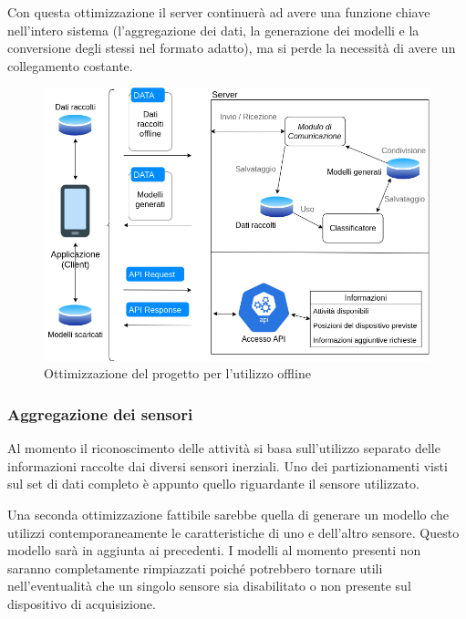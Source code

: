 \vspace{5mm} %
Con questa ottimizzazione il server continuerà ad avere una funzione chiave nell'intero sistema (l'aggregazione dei dati, la 
generazione dei modelli e la conversione degli stessi nel formato adatto), ma si perde la necessità di avere un collegamento costante.

\begin{figure}[H]
    \centering
    \includegraphics[scale = 0.56]{assets/images/future/offline.png}
    \caption{Ottimizzazione del progetto per l'utilizzo offline}
    \label{fig:future_overview}
\end{figure}

\subsubsection{Aggregazione dei sensori}
Al momento il riconoscimento delle attività si basa sull'utilizzo separato delle informazioni raccolte dai diversi sensori inerziali.
Uno dei partizionamenti visti sul set di dati completo è appunto quello riguardante il sensore utilizzato.

\vspace{5mm} %

Una seconda ottimizzazione fattibile sarebbe quella di generare un modello che utilizzi contemporaneamente le caratteristiche di uno e dell'altro sensore.
Questo modello sarà in aggiunta ai precedenti. I modelli al momento presenti non saranno completamente rimpiazzati poiché potrebbero 
tornare utili nell'eventualità che un singolo sensore sia disabilitato o non presente sul dispositivo di acquisizione.

